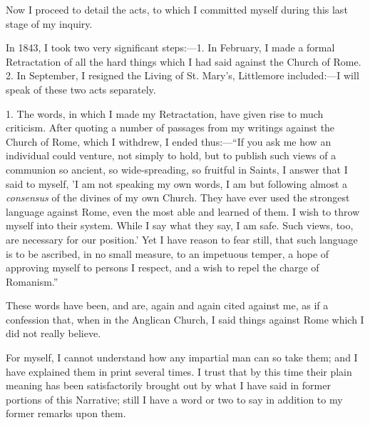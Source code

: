 Now I proceed to detail the acts, to which I committed myself during
this last stage of my inquiry.

In 1843, I took two very significant steps:—1. In
February, I made a formal Retractation of all the hard things which I
had said against the Church of Rome. 2. In September, I resigned the
Living of St. Mary's, Littlemore included:—I will speak of
these two acts separately.

1. The words, in which I made my Retractation, have given rise to
much criticism. After quoting a number of passages from my writings
against the Church of Rome, which I withdrew, I ended thus:—``If
you ask me how an individual could venture, not simply to hold, but to
publish such views of a communion so ancient, so wide-spreading, so
fruitful in Saints, I answer that I said to myself, 'I am not speaking
my own words, I am but following almost a \emph{consensus} of the
divines of my own Church. They have ever used the strongest language
against Rome, even the most able and learned of them. I wish to throw
myself into their system. While I say what they say, I am safe. Such
views, too, are necessary for our position.' Yet I have reason to fear
still, that such language is to be ascribed, in no small measure, to an
impetuous temper, a hope of approving myself to persons I respect, and a
wish to repel the charge of Romanism.''

These words have been, and are, again and again cited
against me, as if a confession that, when in the Anglican Church, I said
things against Rome which I did not really believe.

For myself, I cannot understand how any impartial man can so take
them; and I have explained them in print several times. I trust that by
this time their plain meaning has
been satisfactorily brought out by what I have
said in former portions of this Narrative; still I have a word or two to
say in addition to my former remarks upon them.

